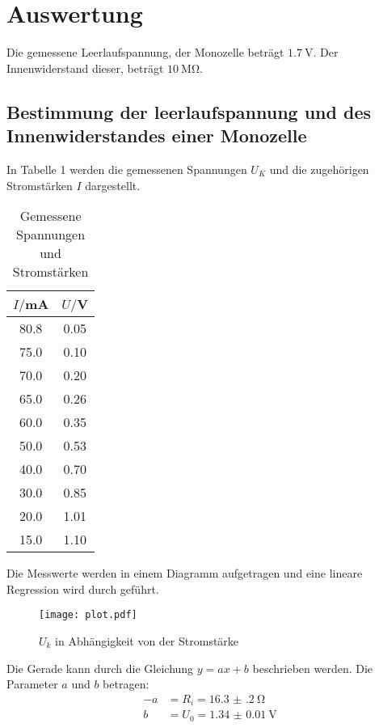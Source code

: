 \section{Auswertung}
\label{sec:Auswertung}

Die gemessene Leerlaufspannung, der Monozelle beträgt $\SI{1.7}{\volt}$. Der Innenwiderstand dieser, beträgt $\SI{10}{\mega\ohm}$.

\subsection{Bestimmung der leerlaufspannung und des Innenwiderstandes einer Monozelle}

In Tabelle 1 werden die gemessenen Spannungen $U_K$ und die zugehörigen Stromstärken $I$ dargestellt.

\begin{table}[H]
  \centering
  \caption{Gemessene Spannungen und Stromstärken}
  \label{tab:spannung1}
  \begin{tabular}{c c}
    \toprule
    $I/$mA & $U/$V \\
    \midrule
    80.8  &  0.05 \\
    75.0  &  0.10 \\
    70.0  &  0.20 \\
    65.0  &  0.26 \\
    60.0  &  0.35 \\
    50.0  &  0.53 \\
    40.0  &  0.70 \\
    30.0  &  0.85 \\
    20.0  &  1.01 \\
    15.0  &  1.10 \\
    \bottomrule
  \end{tabular}
\end{table}

Die Messwerte werden in einem Diagramm aufgetragen und eine lineare Regression wird durch geführt.


\begin{figure}[H]
  \centering
  \texttt{[image: plot.pdf]}
  \caption{$U_k$ in Abhängigkeit von der Stromstärke}
  \label{fig:plot}
\end{figure}

Die Gerade kann durch die Gleichung $y = ax + b$ beschrieben werden. Die Parameter $a$ und $b$ betragen:
\begin{align*}
  -a &= R_i = \SI{16.3(2)}{\ohm} \\
  b &= U_0 = \SI{1.34(1)}{\volt}
\end{align*}


